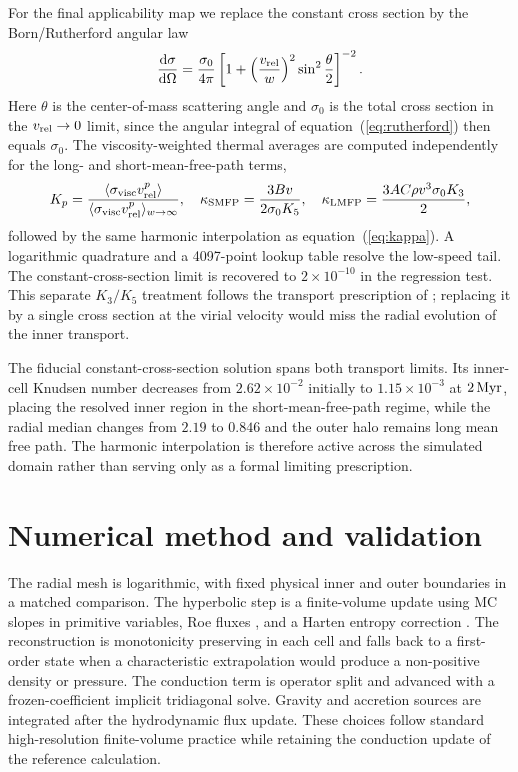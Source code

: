 \documentclass[11pt]{article}
\newcommand{\dd}{\mathrm{d}}
\begin{document}
For the final applicability map we replace the constant cross section by the Born/Rutherford angular law
\begin{equation}
 \frac{\dd\sigma}{\dd\Omega}=\frac{\sigma_0}{4\pi}\left[1+\left(\frac{v_{\rm rel}}{w}\right)^2\sin^2\frac{\theta}{2}\right]^{-2} .
 \label{eq:rutherford}
\end{equation}
Here $\theta$ is the center-of-mass scattering angle and $\sigma_0$ is the total cross section in the $v_{\rm rel}\rightarrow0$ limit, since the angular integral of equation~(\ref{eq:rutherford}) then equals $\sigma_0$.
The viscosity-weighted thermal averages are computed independently for the long- and short-mean-free-path terms,
\begin{equation}
 K_p=\frac{\langle\sigma_{\rm visc}v_{\rm rel}^p\rangle}{\langle\sigma_{\rm visc}v_{\rm rel}^p\rangle_{w\rightarrow\infty}},\quad
 \kappa_{\rm SMFP}=\frac{3Bv}{2\sigma_0K_5},\quad
 \kappa_{\rm LMFP}=\frac{3AC\rho v^3\sigma_0K_3}{2},
 \label{eq:velclosure}
\end{equation}
followed by the same harmonic interpolation as equation~(\ref{eq:kappa}).  A logarithmic quadrature and a 4097-point lookup table resolve the low-speed tail.  The constant-cross-section limit is recovered to $2\times10^{-10}$ in the regression test.  This separate $K_3/K_5$ treatment follows the transport prescription of \citet{Outmezguine2023}; replacing it by a single cross section at the virial velocity would miss the radial evolution of the inner transport.

The fiducial constant-cross-section solution spans both transport limits.  Its inner-cell Knudsen number decreases from $2.62\times10^{-2}$ initially to $1.15\times10^{-3}$ at $2\,{\rm Myr}$, placing the resolved inner region in the short-mean-free-path regime, while the radial median changes from $2.19$ to $0.846$ and the outer halo remains long mean free path.  The harmonic interpolation is therefore active across the simulated domain rather than serving only as a formal limiting prescription.

\section{Numerical method and validation}
\label{sec:numerics}

The radial mesh is logarithmic, with fixed physical inner and outer boundaries in a matched comparison.  The hyperbolic step is a finite-volume update using MC slopes in primitive variables, Roe fluxes \citep{Roe1981}, and a Harten entropy correction \citep{Harten1983}.  The reconstruction is monotonicity preserving in each cell and falls back to a first-order state when a characteristic extrapolation would produce a non-positive density or pressure.  The conduction term is operator split and advanced with a frozen-coefficient implicit tridiagonal solve.  Gravity and accretion sources are integrated after the hydrodynamic flux update.  These choices follow standard high-resolution finite-volume practice \citep{VanLeer1977,Toro2009} while retaining the conduction update of the reference calculation.
\end{document}
